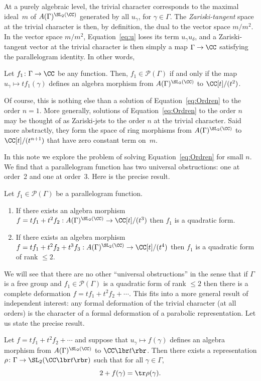 At a purely algebraic level, the trivial character corresponds to the
maximal ideal~$m$ of $A(\Gamma)^{\SL_2(\CC)}$ generated by all
$u_\gamma$, for $\gamma\in\Gamma$.
The {\em Zariski-tangent} space at the trivial character is then, by
definition, the dual to the vector space $m/m^2$.
In the vector space $m/m^2$, Equation~\eqref{eq:u} loses its term
$u_\gamma u_\delta$, and a Zariski-tangent vector at the trivial
character is then simply a map $\Gamma\to\CC$ satisfying the parallelogram
identity.
In other words,
\begin{observation}
Let $f_1\colon\Gamma\to\CC$ be any function.
Then, $f_1\in\mathcal{P}(\Gamma)$ if and only if the map
$u_\gamma\mapsto tf_1(\gamma)$ defines an algebra morphism from
$A(\Gamma)^{\SL_2(\CC)}$ to $\CC[t]/(t^2)$.
\end{observation}
Of course, this is nothing else than a solution of
Equation~\eqref{eq:Ordren} to the order $n=1$.
More generally, solutions of Equation~\eqref{eq:Ordren} to the order $n$
may be thought of as Zariski-jets
to the order $n$
at the trivial character.
Said more abstractly, they form the space of ring morphisms from
$A(\Gamma)^{\SL_2(\CC)}$ to $\CC[t]/(t^{n+1})$ that have zero constant term
on~$m$.

In this note we explore the problem of solving Equation~\eqref{eq:Ordren}
for small $n$. We find that a parallelogram function has two universal
obstructions: one at order~2 and one at order~3. Here is the precise result.
\begin{theorem}\label{theo:obstruction}
Let $f_1\in \mathcal{P}(\Gamma)$ be a parallelogram function.
\begin{enumerate}
\item If there exists an algebra morphism
$f=tf_1+t^2f_2:A(\Gamma)^{\SL_2(\CC)}\to \CC[t]/(t^3)$
then $f_1$ is a quadratic form.
\item If there exists an algebra morphism
$f=tf_1+t^2f_2+t^3f_3:A(\Gamma)^{\SL_2(\CC)}\to \CC[t]/(t^4)$
then $f_1$ is a quadratic form of rank $\leq 2$.
\end{enumerate}
\end{theorem}

We will see that there are no other ``universal obstructions'' in the sense
that if $\Gamma$ is a free group and $f_1\in \mathcal{P}(\Gamma)$ is a
quadratic form of rank $\leq 2$ then there is a complete deformation
$f=tf_1+t^2f_2+\cdots$. This fits into a more general result of independent
interest: any formal deformation of the trivial character (at all orders)
is the character of a formal deformation of a parabolic representation.
Let us state the precise result.
\begin{theorem}\label{theo:lifting}
Let $f=tf_1+t^2 f_2+\cdots$
and suppose that $u_\gamma\mapsto f(\gamma)$ defines an algebra morphism
from $A(\Gamma)^{\SL_2(\CC)}$ to $\CC\lbr t\rbr$. Then there
exists a representation $\rho\colon\Gamma\to \SL_2(\CC\lbr t\rbr)$ such that
for all $\gamma\in \Gamma$,
\[
2+f(\gamma)=\tr \rho(\gamma).
\]
\end{theorem}

